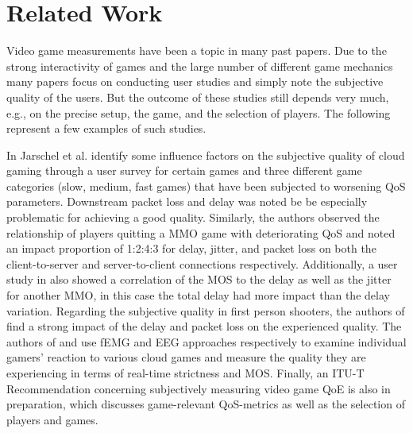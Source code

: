 \section{Related Work}
\label{sec:relatedwork}

Video game measurements have been a topic in many past papers. Due to 
the strong interactivity of games and the large number of different 
game mechanics many papers focus on conducting user studies and simply 
note the subjective quality of the users. But the outcome of these 
studies still depends very much, e.g., on the precise setup, the game, 
and the selection of players. The following represent a few examples of 
such studies. 

In \cite{5976180} Jarschel et al. identify some influence factors on 
the subjective quality of cloud gaming through a user survey for 
certain games and three different game categories (slow, medium, fast 
games) that have been subjected to worsening \gls{QoS} parameters. 
Downstream packet loss and delay was noted be be especially problematic 
for achieving a good quality. Similarly, the authors \cite{4591393} 
observed the relationship of players quitting a \gls{MMO} game with 
deteriorating \gls{QoS} and noted an impact proportion of 1:2:4:3 for 
delay, jitter, and packet loss on both the client-to-server and 
server-to-client connections respectively. Additionally, a user study 
in \cite{4604397} also showed a correlation of the \gls{MOS} to the 
delay as well as the jitter for another \gls{MMO}, in this case the 
total delay had more impact than the delay variation. Regarding the 
subjective quality in first person shooters, the authors of 
\cite{6614351} find a strong impact of the delay and packet loss on the 
experienced quality. The authors of \cite{6404025} and 
\cite{beyerusing} use \gls{fEMG} and \gls{EEG} approaches respectively 
to examine individual gamers' reaction to various cloud games and 
measure the quality they are experiencing in terms of real-time 
strictness and \gls{MOS}. Finally, an ITU-T Recommendation 
\cite{mollertowards} concerning subjectively measuring video game 
\gls{QoE} is also in preparation, which discusses game-relevant 
\gls{QoS}-metrics as well as the selection of players and games.

